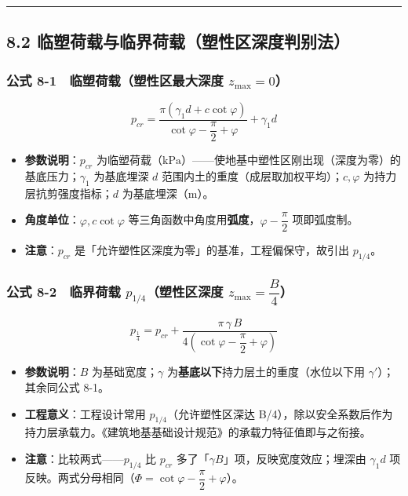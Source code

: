 \documentclass[
]{article}
\providecommand{\tightlist}{%
  \setlength{\itemsep}{0pt}\setlength{\parskip}{0pt}}
\begin{document}
\begin{center}\rule{0.5\linewidth}{0.5pt}\end{center}

\subsection{8.2
临塑荷载与临界荷载（塑性区深度判别法）}\label{ux4e34ux5851ux8377ux8f7dux4e0eux4e34ux754cux8377ux8f7dux5851ux6027ux533aux6df1ux5ea6ux5224ux522bux6cd5}

\subsubsection{\texorpdfstring{公式 8-1　临塑荷载（塑性区最大深度
\(z_{\max}=0\)）}{公式 8-1　临塑荷载（塑性区最大深度 z\_\{\textbackslash max\}=0）}}\label{ux516cux5f0f-8-1-ux4e34ux5851ux8377ux8f7dux5851ux6027ux533aux6700ux5927ux6df1ux5ea6-z_max0}

\[\boxed{p_{cr}=\frac{\pi\left(\gamma_1 d+c\cot\varphi\right)}{\cot\varphi-\dfrac{\pi}{2}+\varphi}+\gamma_1 d}\]

\begin{itemize}
\tightlist
\item
  \textbf{参数说明}：\(p_{cr}\)
  为临塑荷载（\(\mathrm{kPa}\)）------使地基中塑性区刚出现（深度为零）的基底压力；\(\gamma_1\)
  为基底埋深 \(d\) 范围内土的重度（成层取加权平均）；\(c,\varphi\)
  为持力层抗剪强度指标；\(d\) 为基底埋深（m）。
\item
  \textbf{角度单位}：\(\varphi,c\cot\varphi\)
  等三角函数中角度用\textbf{弧度}，\(\varphi-\dfrac{\pi}{2}\)
  项即弧度制。
\item
  \textbf{注意}：\(p_{cr}\)
  是「允许塑性区深度为零」的基准，工程偏保守，故引出 \(p_{1/4}\)。
\end{itemize}

\subsubsection{\texorpdfstring{公式 8-2　临界荷载
\(p_{1/4}\)（塑性区深度
\(z_{\max}=\dfrac{B}{4}\)）}{公式 8-2　临界荷载 p\_\{1/4\}（塑性区深度 z\_\{\textbackslash max\}=\textbackslash dfrac\{B\}\{4\}）}}\label{ux516cux5f0f-8-2-ux4e34ux754cux8377ux8f7d-p_14ux5851ux6027ux533aux6df1ux5ea6-z_maxdfracb4}

\[p_{\frac{1}{4}}=p_{cr}+\frac{\pi\,\gamma\,B}{4\left(\cot\varphi-\dfrac{\pi}{2}+\varphi\right)}\]

\begin{itemize}
\tightlist
\item
  \textbf{参数说明}：\(B\) 为基础宽度；\(\gamma\)
  为\textbf{基底以下}持力层土的重度（水位以下用
  \(\gamma'\)）；其余同公式 8-1。
\item
  \textbf{工程意义}：工程设计常用 \(p_{1/4}\)（允许塑性区深达
  B/4），除以安全系数后作为持力层承载力。《建筑地基基础设计规范》的承载力特征值即与之衔接。
\item
  \textbf{注意}：比较两式------\(p_{1/4}\) 比 \(p_{cr}\)
  多了「\(\gamma B\)」项，反映宽度效应；埋深由 \(\gamma_1 d\)
  项反映。两式分母相同（\(\Phi=\cot\varphi-\dfrac{\pi}{2}+\varphi\)）。
\end{itemize}
\end{document}
